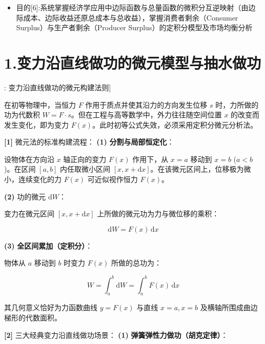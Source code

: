 \documentclass[11pt,a4paper,UTF8]{ctexart}
\begin{document}
\begin{targetbox}[本章复习目标与核心知识图谱]
\begin{itemize}
  \item 目的[6]:系统掌握经济学应用中边际函数与总量函数的微积分互逆映射（由边际成本、边际收益还原总成本与总收益），掌握消费者剩余（Consumer Surplus）与生产者剩余（Producer Surplus）的定积分模型及市场均衡分析
\end{itemize}
\end{targetbox}


\section{1.变力沿直线做功的微元模型与抽水做功}

\begin{thmbox}[方法[1]: 变力沿直线做功的微元构建法则]

在初等物理中，当恒力 $F$ 作用于质点并使其沿力的方向发生位移 $s$ 时，力所做的功为代数积 $W = F \cdot s$。但在工程与高等数学中，外力往往随空间位置 $x$ 的改变而发生变化，即为变力 $F(x)$。此时初等公式失效，必须采用定积分微元分析法。

\textbf{[1]} 微元法的标准构建流程：
\textbf{(1)}  \textbf{分割与局部恒定化}：

设物体在方向沿 $x$ 轴正向的变力 $F(x)$ 作用下，从 $x = a$ 移动到 $x = b$ ($a < b$)。在区间 $[a, b]$ 内任取微小区间 $[x, x + \mathrm{d}x]$。在该微元区间上，位移极为微小，连续变化的力 $F(x)$ 可近似视作恒力 $F(x)$。

\textbf{(2)}  \textit{}功的微元 $\mathrm{d}W$\textit{}：

变力在微元区间 $[x, x + \mathrm{d}x]$ 上所做的微元功为力与微位移的乘积：


\begin{equation*}
\mathrm{d}W = F(x)\,\mathrm{d}x
\end{equation*}


\textbf{(3)}  \textbf{全区间累加（定积分）}：

物体从 $a$ 移动到 $b$ 时变力 $F(x)$ 所做的总功为：


\begin{equation*}
W = \int_a^b \mathrm{d}W = \int_a^b F(x)\,\mathrm{d}x
\end{equation*}


其几何意义恰好为力函数曲线 $y = F(x)$ 与直线 $x = a, x = b$ 及横轴所围成曲边梯形的代数面积。

\textbf{[2]} 三大经典变力沿直线做功场景：
\textbf{(1)}  \textbf{弹簧弹性力做功（胡克定律）}：


\end{thmbox}
\end{document}
